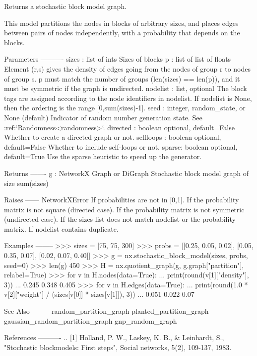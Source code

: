 \begin{DoxyVerb}Returns a stochastic block model graph.

This model partitions the nodes in blocks of arbitrary sizes, and places
edges between pairs of nodes independently, with a probability that depends
on the blocks.

Parameters
----------
sizes : list of ints
    Sizes of blocks
p : list of list of floats
    Element (r,s) gives the density of edges going from the nodes
    of group r to nodes of group s.
    p must match the number of groups (len(sizes) == len(p)),
    and it must be symmetric if the graph is undirected.
nodelist : list, optional
    The block tags are assigned according to the node identifiers
    in nodelist. If nodelist is None, then the ordering is the
    range [0,sum(sizes)-1].
seed : integer, random_state, or None (default)
    Indicator of random number generation state.
    See :ref:`Randomness<randomness>`.
directed : boolean optional, default=False
    Whether to create a directed graph or not.
selfloops : boolean optional, default=False
    Whether to include self-loops or not.
sparse: boolean optional, default=True
    Use the sparse heuristic to speed up the generator.

Returns
-------
g : NetworkX Graph or DiGraph
    Stochastic block model graph of size sum(sizes)

Raises
------
NetworkXError
  If probabilities are not in [0,1].
  If the probability matrix is not square (directed case).
  If the probability matrix is not symmetric (undirected case).
  If the sizes list does not match nodelist or the probability matrix.
  If nodelist contains duplicate.

Examples
--------
>>> sizes = [75, 75, 300]
>>> probs = [[0.25, 0.05, 0.02], [0.05, 0.35, 0.07], [0.02, 0.07, 0.40]]
>>> g = nx.stochastic_block_model(sizes, probs, seed=0)
>>> len(g)
450
>>> H = nx.quotient_graph(g, g.graph["partition"], relabel=True)
>>> for v in H.nodes(data=True):
...     print(round(v[1]["density"], 3))
...
0.245
0.348
0.405
>>> for v in H.edges(data=True):
...     print(round(1.0 * v[2]["weight"] / (sizes[v[0]] * sizes[v[1]]), 3))
...
0.051
0.022
0.07

See Also
--------
random_partition_graph
planted_partition_graph
gaussian_random_partition_graph
gnp_random_graph

References
----------
.. [1] Holland, P. W., Laskey, K. B., & Leinhardt, S.,
       "Stochastic blockmodels: First steps",
       Social networks, 5(2), 109-137, 1983.
\end{DoxyVerb}
 \mbox{\label{namespacenetworkx_1_1generators_1_1community_a75c382b5879da332996f5ec2bfea4c6b}} 
